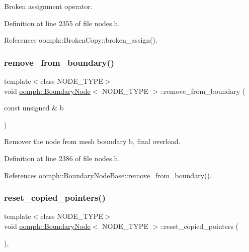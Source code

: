 Broken assignment operator. 



Definition at line 2355 of file nodes.\+h.



References oomph\+::\+Broken\+Copy\+::broken\+\_\+assign().

\mbox{\label{classoomph_1_1BoundaryNode_a95b9f27994cc3cd64d33ccb287bbd92a}} 
\subsubsection{\texorpdfstring{remove\+\_\+from\+\_\+boundary()}{remove\_from\_boundary()}}
{\footnotesize\ttfamily template$<$class N\+O\+D\+E\+\_\+\+T\+Y\+PE$>$ \\
void \hyperlink{classoomph_1_1BoundaryNode}{oomph\+::\+Boundary\+Node}$<$ N\+O\+D\+E\+\_\+\+T\+Y\+PE $>$\+::remove\+\_\+from\+\_\+boundary (\begin{DoxyParamCaption}\item[{const unsigned \&}]{b }\end{DoxyParamCaption})\hspace{0.3cm}{\ttfamily [inline]}}



Remover the node from mesh boundary b, final overload. 



Definition at line 2386 of file nodes.\+h.



References oomph\+::\+Boundary\+Node\+Base\+::remove\+\_\+from\+\_\+boundary().

\mbox{\label{classoomph_1_1BoundaryNode_ab90ca88d1178cfab62445d198470d404}} 
\subsubsection{\texorpdfstring{reset\+\_\+copied\+\_\+pointers()}{reset\_copied\_pointers()}}
{\footnotesize\ttfamily template$<$class N\+O\+D\+E\+\_\+\+T\+Y\+PE$>$ \\
void \hyperlink{classoomph_1_1BoundaryNode}{oomph\+::\+Boundary\+Node}$<$ N\+O\+D\+E\+\_\+\+T\+Y\+PE $>$\+::reset\+\_\+copied\+\_\+pointers (\begin{DoxyParamCaption}{ }\end{DoxyParamCaption})\hspace{0.3cm}{\ttfamily [inline]}, {\ttfamily [private]}}



